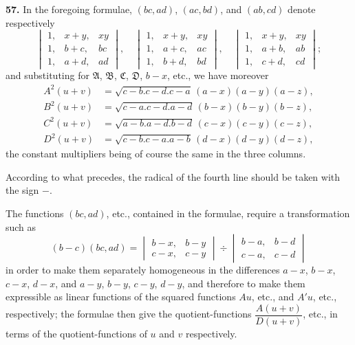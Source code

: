 \documentclass[11pt,a4paper]{book}
\begin{document}
\noindent\textbf{57.}\quad
In the foregoing formulae, $(bc, ad)$, $(ac, bd)$, and $(ab, cd)$ denote respectively
\[
\begin{vmatrix}
1, & x + y, & xy \\
1, & b + c, & bc \\
1, & a + d, & ad
\end{vmatrix},\quad
\begin{vmatrix}
1, & x + y, & xy \\
1, & a + c, & ac \\
1, & b + d, & bd
\end{vmatrix},\quad
\begin{vmatrix}
1, & x + y, & xy \\
1, & a + b, & ab \\
1, & c + d, & cd
\end{vmatrix};
\]
and substituting for $\mathfrak{A}$, $\mathfrak{B}$, $\mathfrak{C}$, $\mathfrak{D}$, $b - x$, etc., we have moreover
\begin{align*}
A^2(u + v) &= \sqrt{c - b . c - d . c - a}\, (a - x)(a - y)(a - z), \\
B^2(u + v) &= \sqrt{c - a . c - d . a - d}\, (b - x)(b - y)(b - z), \\
C^2(u + v) &= \sqrt{a - b . a - d . b - d}\, (c - x)(c - y)(c - z), \\
D^2(u + v) &= \sqrt{c - b . c - a . a - b}\, (d - x)(d - y)(d - z),
\end{align*}
the constant multipliers being of course the same in the three columns.

According to what precedes, the radical of the fourth line should be taken with the sign $-$.

The functions $(bc, ad)$, etc., contained in the formulae, require a transformation such as
\[
(b - c)(bc, ad) = \begin{vmatrix} b - x, & b - y \\ c - x, & c - y \end{vmatrix} \div \begin{vmatrix} b - a, & b - d \\ c - a, & c - d \end{vmatrix}
\]
in order to make them separately homogeneous in the differences $a - x$, $b - x$, $c - x$, $d - x$, and $a - y$, $b - y$, $c - y$, $d - y$, and therefore to make them expressible as linear functions of the squared functions $Au$, etc., and $A'u$, etc., respectively; the formulae then give the quotient-functions $\dfrac{A(u + v)}{D(u + v)}$, etc., in terms of the quotient-functions of $u$ and $v$ respectively.
\end{document}
